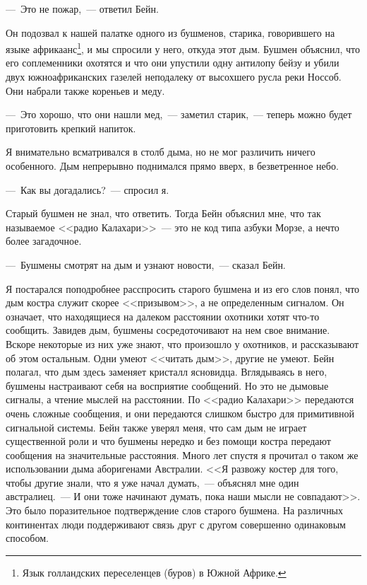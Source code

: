 \documentclass[12pt,a4paper,twoside,openany,svgnames]{memoir}
\begin{document}
---~Это не пожар,~--- ответил Бейн.

Он подозвал к нашей палатке одного из бушменов, старика, говорившего на языке африкаанс\footnote{Язык голландских переселенцев (буров) в Южной Африке.}, и мы спросили у него, откуда этот дым. Бушмен объяснил, что его соплеменники охотятся и что они упустили одну антилопу бейзу и убили двух южноафриканских газелей неподалеку от высохшего русла реки Носсоб. Они набрали также кореньев и меду.


---~Это хорошо, что они нашли мед,~--- заметил старик,~--- теперь можно будет приготовить крепкий напиток.

Я внимательно всматривался в столб дыма, но не мог различить ничего особенного. Дым непрерывно поднимался прямо вверх, в безветренное небо.

---~Как вы догадались?~--- спросил я.

Старый бушмен не знал, что ответить. Тогда Бейн объяснил мне, что так называемое <<радио Калахари>>~--- это не код типа азбуки Морзе, а нечто более загадочное.

---~Бушмены смотрят на дым и узнают новости,~--- сказал Бейн.

Я постарался поподробнее расспросить старого бушмена и из его слов понял, что дым костра служит скорее <<призывом>>, а не определенным сигналом. Он означает, что находящиеся на далеком расстоянии охотники хотят что-то сообщить. Завидев дым, бушмены сосредоточивают на нем свое внимание. Вскоре некоторые из них уже знают, что произошло у охотников, и рассказывают об этом остальным. Одни умеют <<читать дым>>, другие не умеют. Бейн полагал, что дым здесь заменяет кристалл ясновидца. Вглядываясь в него, бушмены настраивают себя на восприятие сообщений. Но это не дымовые сигналы, а чтение мыслей на расстоянии. По <<радио Калахари>> передаются очень сложные сообщения, и они передаются слишком быстро для примитивной сигнальной системы. Бейн также уверял меня, что сам дым не играет существенной роли и что бушмены нередко и без помощи костра передают сообщения на значительные расстояния. Много лет спустя я прочитал о таком же использовании дыма аборигенами Австралии. <<Я развожу костер для того, чтобы другие знали, что я уже начал думать,~--- объяснял мне один австралиец.~--- И они тоже начинают думать, пока наши мысли не совпадают>>. Это было поразительное подтверждение слов старого бушмена. На различных континентах люди поддерживают связь друг с другом совершенно одинаковым способом.
\end{document}
